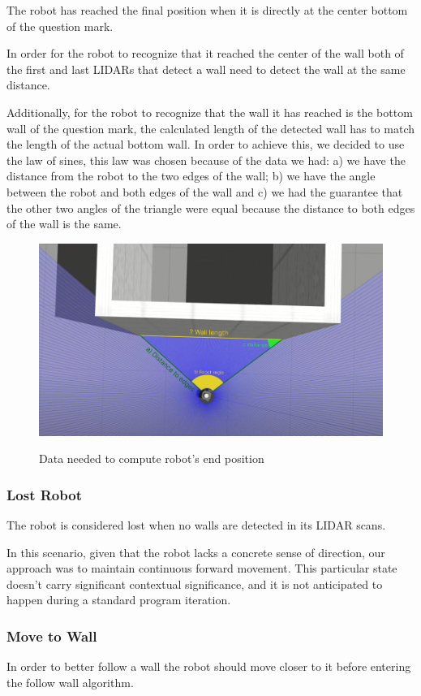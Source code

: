 \documentclass[conference]{IEEEtran}
\begin{document}
The robot has reached the final position when it is directly at the center bottom of the question mark.

In order for the robot to recognize that it reached the center of the wall both of the first and last LIDARs that detect a wall need to detect the wall at the same distance.

Additionally, for the robot to recognize that the wall it has reached is the bottom wall of the question mark, the calculated length of the detected wall has to match the length of the actual bottom wall. In order to achieve this, we decided to use the law of sines, this law was chosen because of the data we had: a) we have the distance from the robot to the two edges of the wall; b) we have the angle between the robot and both edges of the wall and c) we had the guarantee that the other two angles of the triangle were equal because the distance to both edges of the wall is the same.

\begin{figure}[h]
    \centering
    \includegraphics[width=.47\textwidth]          {images/robotEndCalc.png}
    \label{fig:robot-end-calculation}
    \caption{Data needed to compute robot's end position}
\end{figure}

\subsubsection{Lost Robot}
The robot is considered lost when no walls are detected in its LIDAR scans.

In this scenario, given that the robot lacks a concrete sense of direction, our approach was to maintain continuous forward movement. This particular state doesn't carry significant contextual significance, and it is not anticipated to happen during a standard program iteration.

\subsubsection{Move to Wall}
In order to better follow a wall the robot should move closer to it before entering the follow wall algorithm.
\end{document}
